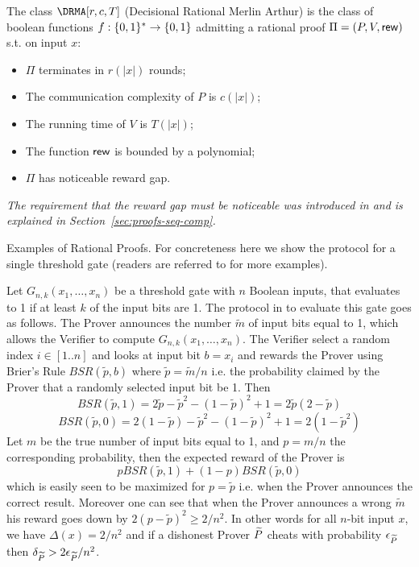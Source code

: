 \begin{definition}
The class $\DRMA[r, c, T]$ (Decisional Rational Merlin Arthur)
is the class of boolean functions $f : \{0, 1\}^{*} \to \{0, 1\}$ admitting a rational proof $\Pi = (P,V, \mathsf{rew})$ s.t. on input $x$:
\begin{itemize}
    \item $\Pi$ terminates in $r(|x|)$ rounds;
    \item The communication complexity of $P$ is $c(|x|)$;
    \item The running time of $V$ is $T(|x|)$;
    \item The function $\mathsf{rew}$ is bounded by a polynomial;
    \item $\Pi$ has noticeable reward gap.
\end{itemize}
\end{definition}

\noindent
\begin{remark}
\label{rem:asy}
{\em The requirement that the reward gap must be noticeable was introduced in 
\cite{am1,ratargs} and is explained in Section~\ref{sec:proofs-seq-comp}.}
\end{remark}

\label{sec:example}
\smallskip
\noindent
{\sc Examples of Rational Proofs.} For concreteness here we show the protocol for a single threshold gate (readers are referred to \cite{am,am1,ratargs} for more examples). 

Let $G_{n,k}(x_1,\ldots,x_n)$ be a threshold gate with $n$ Boolean inputs, that evaluates to 1 if at least $k$ of the input bits are 1. The protocol in \cite{am1} to evaluate this gate goes as follows. The Prover announces the number $\tilde{m}$ of input bits equal to 1, which allows the Verifier to compute $G_{n,k}(x_1,\ldots,x_n)$. The Verifier select a random index $i \in [1..n]$ and looks at input bit $b=x_i$ and rewards the Prover using Brier's Rule $BSR(\tilde{p},b)$ where $\tilde{p}=\tilde{m}/n$ i.e. the probability claimed by the Prover that a randomly selected input bit be 1. Then
\[BSR(\tilde{p},1) = 2\tilde{p} - \tilde{p}^2 - (1-\tilde{p})^2 + 1 = 2\tilde{p}(2-\tilde{p}) \]
\[BSR(\tilde{p},0) = 2(1-\tilde{p}) - \tilde{p}^2 - (1-\tilde{p})^2 +1 = 2(1-\tilde{p}^2) \]
Let $m$ be the true number of input bits equal to 1, and $p=m/n$ the corresponding probability, then the expected reward of the Prover is
\begin{equation}
\label{eq:bsr}
p BSR(\tilde{p},1) + (1-p) BSR(\tilde{p},0) 
\end{equation}
which is easily seen to be maximized for $p=\tilde{p}$ i.e. when the Prover announces the correct result. Moreover one can see that when the Prover announces a wrong $\tilde{m}$ his reward goes down by $2(p-\tilde{p})^2 \geq 2/n^2$. In other words 
for all $n$-bit input $x$, we have $\Delta(x)=2/n^2$ and if a dishonest Prover $\widetilde{P}$ cheats with probability $\epsilon_{\widetilde{P}}$ then $\delta_{\widetilde{P}} > 2\epsilon_{\widetilde{P}}/n^2$. 




